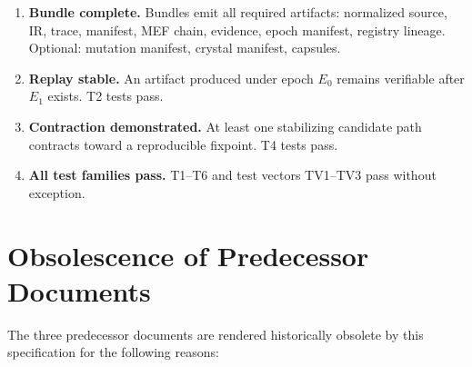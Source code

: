 \documentclass[11pt,a4paper,twoside]{article}
\theoremstyle{definition}
\theoremstyle{remark}
\begin{document}
\begin{enumerate}[label=\textbf{DoD-\arabic*},leftmargin=2.5cm]
  \item \textbf{Bundle complete.} Bundles emit all required artifacts: normalized source, IR, trace, manifest, MEF chain, evidence, epoch manifest, registry lineage. Optional: mutation manifest, crystal manifest, capsules.

  \item \textbf{Replay stable.} An artifact produced under epoch $E_0$ remains verifiable after $E_1$ exists. T2 tests pass.

  \item \textbf{Contraction demonstrated.} At least one stabilizing candidate path contracts toward a reproducible fixpoint. T4 tests pass.

  \item \textbf{All test families pass.} T1--T6 and test vectors TV1--TV3 pass without exception.
\end{enumerate}



\section{Obsolescence of Predecessor Documents}
\label{sec:obsolescence}

The three predecessor documents are rendered historically obsolete by this specification for the following reasons:
\end{document}
